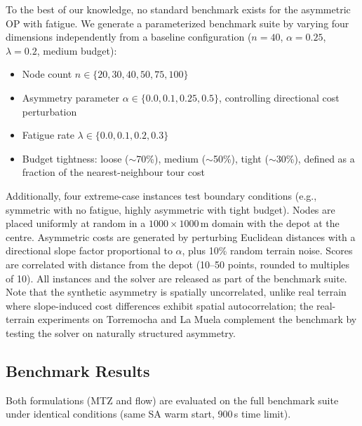 \documentclass[preprint,11pt]{elsarticle}
\begin{document}
To the best of our knowledge, no standard benchmark exists for the asymmetric OP with fatigue.
We generate a parameterized benchmark suite by varying four dimensions independently from a baseline configuration ($n = 40$, $\alpha = 0.25$, $\lambda = 0.2$, medium budget):
\begin{itemize}[nosep]
  \item Node count $n \in \{20, 30, 40, 50, 75, 100\}$
  \item Asymmetry parameter $\alpha \in \{0.0, 0.1, 0.25, 0.5\}$, controlling directional cost perturbation
  \item Fatigue rate $\lambda \in \{0.0, 0.1, 0.2, 0.3\}$
  \item Budget tightness: loose ($\sim$70\%), medium ($\sim$50\%), tight ($\sim$30\%), defined as a fraction of the nearest-neighbour tour cost
\end{itemize}
Additionally, four extreme-case instances test boundary conditions (e.g., symmetric with no fatigue, highly asymmetric with tight budget).
Nodes are placed uniformly at random in a $1000 \times 1000$\,m domain with the depot at the centre.
Asymmetric costs are generated by perturbing Euclidean distances with a directional slope factor proportional to $\alpha$, plus 10\% random terrain noise.
Scores are correlated with distance from the depot (10--50 points, rounded to multiples of 10).
All instances and the solver are released as part of the benchmark suite.
Note that the synthetic asymmetry is spatially uncorrelated, unlike real terrain where slope-induced cost differences exhibit spatial autocorrelation; the real-terrain experiments on Torremocha and La Muela complement the benchmark by testing the solver on naturally structured asymmetry.

\subsection{Benchmark Results}

Both formulations (MTZ and flow) are evaluated on the full benchmark suite under identical conditions (same SA warm start, 900\,s time limit).
\end{document}

